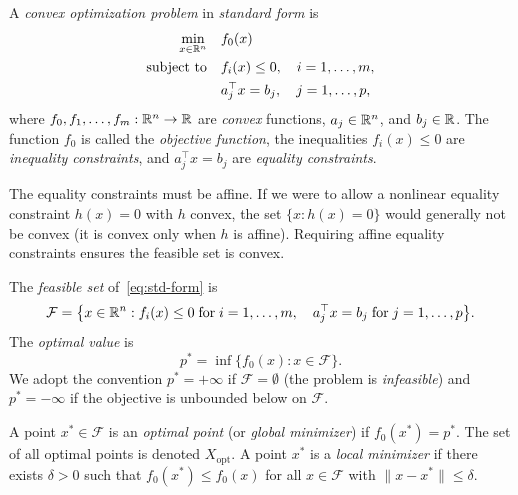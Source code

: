 \documentclass[11pt,a4paper]{article}
\begin{document}
\begin{definition}\label{def:convex-opt}
A \emph{convex optimization problem} in \emph{standard form} is
\begin{equation}\label{eq:std-form}
\begin{aligned}
  \min_{x \in \mathbb{R}^n} \quad & f_0(x) \\
  \text{subject to} \quad & f_i(x) \le 0, \quad i = 1,\dots,m, \\
                          & a_j^\top x = b_j, \quad j = 1,\dots,p,
\end{aligned}
\end{equation}
where $f_0, f_1, \dots, f_m : \mathbb{R}^n \to \mathbb{R}$ are \emph{convex} functions,
$a_j \in \mathbb{R}^n$, and $b_j \in \mathbb{R}$. The function $f_0$ is called the
\emph{objective function}, the inequalities $f_i(x) \le 0$ are
\emph{inequality constraints}, and $a_j^\top x = b_j$ are
\emph{equality constraints}.
\end{definition}

\begin{remark}\label{rem:equality-affine}
The equality constraints must be affine. If we were to allow a nonlinear
equality constraint $h(x) = 0$ with $h$ convex, the set $\{x : h(x) = 0\}$
would generally not be convex (it is convex only when $h$ is affine).
Requiring affine equality constraints ensures the feasible set is convex.
\end{remark}

\begin{definition}\label{def:feasible}
The \emph{feasible set} of~\eqref{eq:std-form} is
\begin{equation}\label{eq:feasible-set}
  \mathcal{F} = \bigl\{x \in \mathbb{R}^n : f_i(x) \le 0 \;\text{for}\;
  i = 1,\dots,m, \quad a_j^\top x = b_j \;\text{for}\;
  j = 1,\dots,p \bigr\}.
\end{equation}
The \emph{optimal value} is
\begin{equation}\label{eq:optimal-value}
  p^* = \inf \{f_0(x) : x \in \mathcal{F}\}.
\end{equation}
We adopt the convention $p^* = +\infty$ if $\mathcal{F} = \emptyset$ (the
problem is \emph{infeasible}) and $p^* = -\infty$ if the objective is
unbounded below on $\mathcal{F}$.
\end{definition}

\begin{definition}\label{def:optimal-point}
A point $x^* \in \mathcal{F}$ is an \emph{optimal point} (or \emph{global
minimizer}) if $f_0(x^*) = p^*$. The set of all optimal points is denoted
$X_{\text{opt}}$. A point $x^*$ is a \emph{local minimizer} if there
exists $\delta > 0$ such that $f_0(x^*) \le f_0(x)$ for all
$x \in \mathcal{F}$ with $\|x - x^*\| \le \delta$.
\end{definition}
\end{document}

